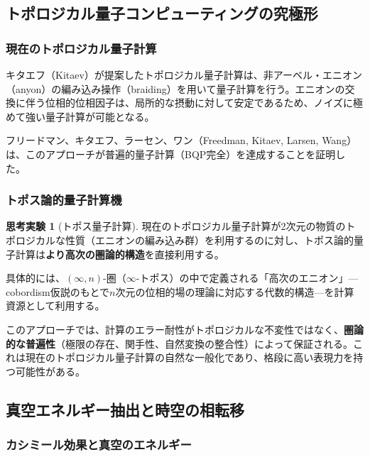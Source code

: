 \documentclass[12pt,a4paper]{ltjsarticle}
\theoremstyle{definition}
\newtheorem{thought}[definition]{思考実験}
\begin{document}
\subsection{トポロジカル量子コンピューティングの究極形}

\subsubsection{現在のトポロジカル量子計算}

キタエフ（Kitaev）が提案したトポロジカル量子計算\cite{Kitaev2003}は、非アーベル・エニオン（anyon）の編み込み操作（braiding）を用いて量子計算を行う。エニオンの交換に伴う位相的位相因子は、局所的な摂動に対して安定であるため、ノイズに極めて強い量子計算が可能となる。

フリードマン、キタエフ、ラーセン、ワン（Freedman, Kitaev, Larsen, Wang）\cite{FreemanKitaevLarsenWang2003}は、このアプローチが普遍的量子計算（BQP完全）を達成することを証明した。

\subsubsection{トポス論的量子計算機}

\begin{thought}[トポス量子計算]
現在のトポロジカル量子計算が2次元の物質のトポロジカルな性質（エニオンの編み込み群）を利用するのに対し、トポス論的量子計算は\textbf{より高次の圏論的構造}を直接利用する。

具体的には、$(\infty,n)$-圏\cite{Lurie2009}（$\infty$-トポス）の中で定義される「高次のエニオン」---cobordism仮説\cite{BaezDolan1995, Lurie2009Hopkins}のもとで$n$次元の位相的場の理論に対応する代数的構造---を計算資源として利用する。

このアプローチでは、計算のエラー耐性がトポロジカルな不変性ではなく、\textbf{圏論的な普遍性}（極限の存在、関手性、自然変換の整合性）によって保証される。これは現在のトポロジカル量子計算の自然な一般化であり、格段に高い表現力を持つ可能性がある。
\end{thought}

\subsection{真空エネルギー抽出と時空の相転移}

\subsubsection{カシミール効果と真空のエネルギー}
\end{document}
